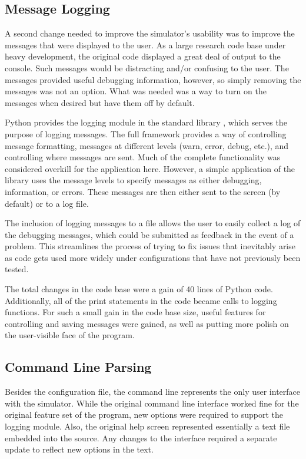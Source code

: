 \documentclass[twocolumn]{article}
\begin{document}
\subsection{Message Logging}
A second change needed to improve the simulator's usability was to improve the
messages that were displayed to the user.  As a large research code base under heavy
development, the original code displayed a great deal of output to the console.
Such messages would be distracting and/or confusing to the user. The messages
provided useful debugging information, however, so simply removing the messages
was not an option. What was needed was a way to turn on the messages when desired
but have them off by default.

Python provides the logging module in the standard library \cite{logging}, which
serves the purpose of logging messages. The full framework provides a way of
controlling message formatting, messages at different levels (warn, error,
debug, etc.), and controlling where messages are sent. Much of the complete
functionality was considered overkill for the application here. However, a
simple application of the library uses the message levels to specify messages as
either debugging, information, or errors. These messages are then either sent to
the screen (by default) or to a log file.

The inclusion of logging messages to a file allows the user to easily collect
a log of the debugging messages, which could be submitted as feedback in the
event of a problem. This streamlines the process of trying to fix issues that
inevitably arise as code gets used more widely under configurations that have
not previously been tested.

The total changes in the code base were a gain of 40 lines of Python code.
Additionally, all of the print statements in the code became
calls to logging functions. For such a small gain in the code base size, useful
features for controlling and saving messages were gained, as well as putting
more polish on the user-visible face of the program.

\subsection{Command Line Parsing}
Besides the configuration file, the command line represents the only user
interface with the simulator. While the original command line interface
worked fine for the original feature set of the program, new options
were required to support the logging module.  Also, the original help screen
represented essentially a text file embedded into the source. Any changes to
the interface required a separate update to reflect new options in the text.
\end{document}
